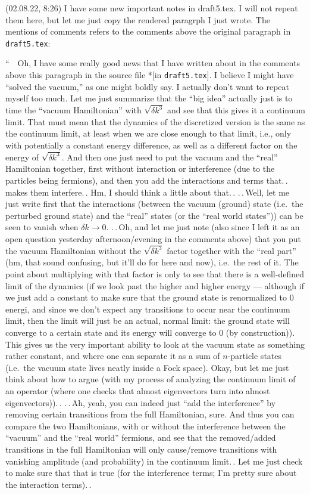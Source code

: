 \documentclass{report}
\begin{document}
(02.08.22, 8:26) I have some new important notes in draft5.tex. I will not repeat them here, but let me just copy the rendered paragrph I just wrote. The mentions of comments refers to the comments above the original paragraph in \texttt{draft5.tex}:

``\ \ Oh, I have some really good news that I have written about in the comments above this paragraph in the source file *[in \texttt{draft5.tex}]. I believe I might have ``solved the vacuum,'' as one might boldly say. I actually don't want to repeat myself too much. Let me just summarize that the ``big idea'' actually just is to time the ``vacuum Hamiltonian'' with $\sqrt{\delta k^3}$ and see that this gives it a continuum limit. That must mean that the dynamics of the discretized version is the same as the continuum limit, at least when we are close enough to that limit, i.e., only with potentially a constant energy difference, as well as a different factor on the energy of $\sqrt{\delta k^3}$. And then one just need to put the vacuum and the ``real'' Hamiltonian together, first without interaction or interference (due to the particles being fermions), and then you add the interactions and terms that.\,. makes them interfere.\,. Hm, I should think a little about that.\,. .\,.\,Well, let me just write first that the interactions (between the vacuum (ground) state (i.e.\ the perturbed ground state) and the ``real'' states (or the ``real world states'')) can be seen to vanish when $\delta k \to 0$. .\,.\,Oh, and let me just note (also since I left it as an open question yesterday afternoon/evening in the comments above) that you put the vacuum Hamiltonian without the $\sqrt{\delta k^3}$ factor together with the ``real part'' (hm, that sound confusing, but it'll do for here and now), i.e.\ the rest of it. The point about multiplying with that factor is only to see that there is a well-defined limit of the dynamics (if we look past the higher and higher energy --- although if we just add a constant to make sure that the ground state is renormalized to 0 energi, and since we don't expect any transitions to occur near the continuum limit, then the limit will just be an actual, normal limit: the ground state will converge to a certain state and its energy will converge to 0 (by construction)). This gives us the very important ability to look at the vacuum state as something rather constant, and where one can separate it as a sum of $n$-particle states (i.e.\ the vacuum state lives neatly inside a Fock space). %
Okay, but let me just think about how to argue (with my process of analyzing the continuum limit of an operator (where one checks that almost eigenvectors turn into almost eigenvectors)).\,. .\,.\,Ah, yeah, you can indeed just ``add the interference'' by removing certain transitions from the full Hamiltonian, sure. And thus you can compare the two Hamiltonians, with or without the interference between the ``vacuum'' and the ``real world'' fermions, and see that the removed/added transitions in the full Hamiltonian will only cause/remove transitions with vanishing amplitude (and probability) in the continuum limit.\,. Let me just check to make sure that that is true (for the interference terms; I'm pretty sure about the interaction terms).\,. %
\end{document}
